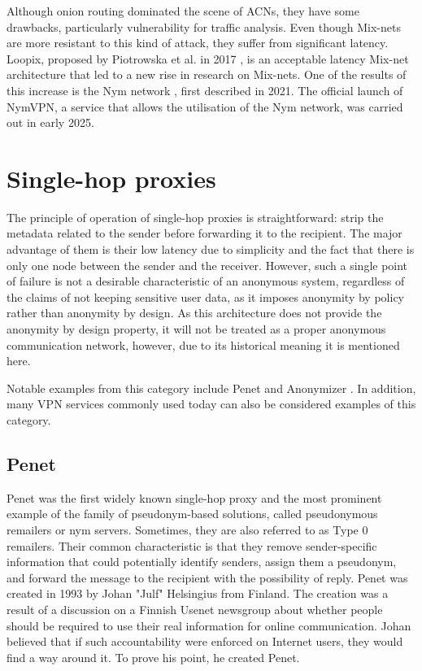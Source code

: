 Although onion routing dominated the scene of ACNs, they have some drawbacks, particularly vulnerability for traffic analysis. Even though Mix-nets are more resistant to this kind of attack, they suffer from significant latency. Loopix, proposed by Piotrowska et al. in 2017 \cite{loopix}, is an acceptable latency Mix-net architecture that led to a new rise in research on Mix-nets. One of the results of this increase is the Nym network \cite{nym}, first described in 2021. The official launch of NymVPN, a service that allows the utilisation of the Nym network, was carried out in early 2025.

\section{Single-hop proxies}
The principle of operation of single-hop proxies is straightforward: strip the metadata related to the sender before forwarding it to the recipient. The major advantage of them is their low latency due to simplicity and the fact that there is only one node between the sender and the receiver. However, such a single point of failure is not a desirable characteristic of an anonymous system, regardless of the claims of not keeping sensitive user data, as it imposes anonymity by policy rather than anonymity by design. As this architecture does not provide the anonymity by design property, it will not be treated as a proper anonymous communication network, however, due to its historical meaning it is mentioned here.

Notable examples from this category include Penet \cite{penet} and Anonymizer \cite{anonymizer}. In addition, many VPN services commonly used today can also be considered examples of this category.

\subsection{Penet}
Penet was the first widely known single-hop proxy and the most prominent example of the family of pseudonym-based solutions, called pseudonymous remailers or nym servers. Sometimes, they are also referred to as Type 0 remailers. Their common characteristic is that they remove sender-specific information that could potentially identify senders, assign them a pseudonym, and forward the message to the recipient with the possibility of reply. Penet was created in 1993 by Johan "Julf" Helsingius from Finland. The creation was a result of a discussion on a Finnish Usenet newsgroup about whether people should be required to use their real information for online communication. Johan believed that if such accountability were enforced on Internet users, they would find a way around it. To prove his point, he created Penet.

